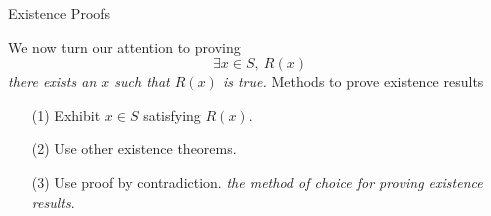 
\begin{mdframed}
\begin{center}
{\Large Existence Proofs}
\end{center}
\end{mdframed}

\begin{discussion}
We now turn our attention to proving 
\[\exists x \in S,\ R(x)\]
\emph{there exists an $x$ such that $R(x)$ is true.} Methods to prove existence results
\begin{itemize}
\item[(1)] Exhibit $x \in S$ satisfying $R(x)$.
\item[(2)] Use other existence theorems.
\item[(3)] Use proof by contradiction. \emph{the method of choice for proving existence results}.
\end{itemize}
\end{discussion}

\vspace*{1em}

